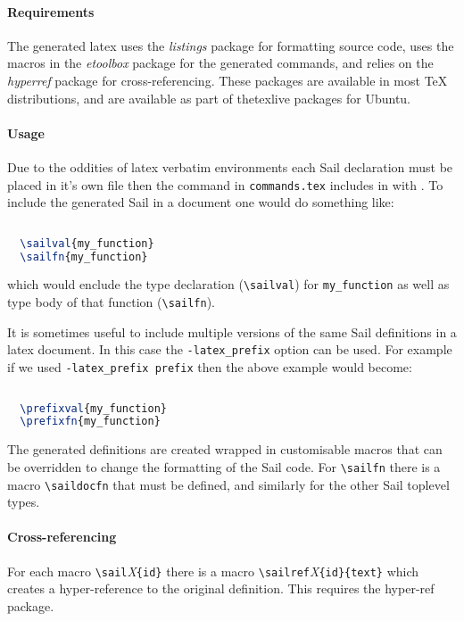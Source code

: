 \paragraph{Requirements} The generated latex uses the \emph{listings} package for formatting
source code, uses the macros in the \emph{etoolbox} package for the
generated commands, and relies on the \emph{hyperref} package for
cross-referencing. These packages are available in most TeX
distributions, and are available as part of thetexlive packages for
Ubuntu.

\paragraph{Usage} Due to the oddities of latex verbatim environments each Sail
declaration must be placed in it's own file then the command in
\verb+commands.tex+ includes in with \verb++. To
include the generated Sail in a document one would do something like:
\begin{lstlisting}[language=TeX]
  
  \sailval{my_function}
  \sailfn{my_function}
\end{lstlisting}
which would enclude the type declaration (\verb+\sailval+) for
\verb+my_function+ as well as type body of that function
(\verb+\sailfn+).

It is sometimes useful to include multiple versions of the same Sail
definitions in a latex document. In this case the \verb+-latex_prefix+
option can be used. For example if we used \verb+-latex_prefix prefix+
then the above example would become:
\begin{lstlisting}[language=TeX]
  
  \prefixval{my_function}
  \prefixfn{my_function}
\end{lstlisting}

The generated definitions are created wrapped in customisable macros
that can be overridden to change the formatting of the Sail code. For
\verb+\sailfn+ there is a macro \verb+\saildocfn+ that must be defined,
and similarly for the other Sail toplevel types.

\paragraph{Cross-referencing} For each macro \verb+\sail+\emph{X}\verb+{id}+ there is a macro
\verb+\sailref+\emph{X}\verb+{id}{text}+ which creates a
hyper-reference to the original definition. This requires the
hyper-ref package.

